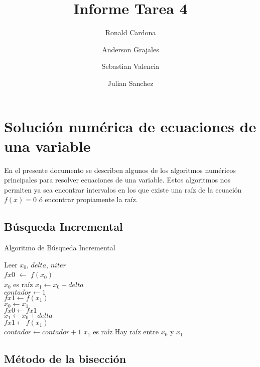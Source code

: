 \documentclass[12pt]{article}
\title{Informe Tarea 4}
\author {Ronald Cardona
\and Anderson Grajales
\and Sebastian Valencia
\and Julian Sanchez}
\begin{document}
\maketitle


\section{Solución numérica de ecuaciones de una variable}

En el presente documento se describen algunos de los algoritmos numéricos principales para resolver ecuaciones de una variable. Estos algoritmos nos permiten ya sea encontrar intervalos en los que existe una raíz de la ecuación $f(x) = 0$ ó encontrar propiamente la raíz.

\subsection{Búsqueda Incremental}

\begin{algorithm}[H]
	\caption{Algoritmo de Búsqueda Incremental}
	\SetAlgoLined
	Leer $x_0$, $delta$, $niter$ \\
	$fx0$ $\leftarrow$ $f(x_0)$ \\
	{$x_0$ es raíz}
	{
		$x_1 \leftarrow x_0 + delta$ \\
		$contador \leftarrow 1$ \\
		$fx1 \leftarrow f(x_1)$ \\
		{
			$x_0 \leftarrow x_1$ \\
			$fx0 \leftarrow fx1$ \\
			$x_1 \leftarrow x_0 + delta$ \\
			$fx1 \leftarrow f(x_1)$ \\
			$contador \leftarrow contador + 1$
		}
		{$x_1$ es raíz}
		{Hay raíz entre $x_0$ y $x_1$}
	}
\end{algorithm}

\subsection{Método de la bisección}
\end{document}
